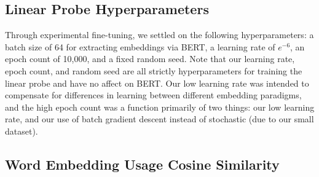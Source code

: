 \documentclass[11pt,a4paper]{article}
\begin{document}
\begin{table*}[h]
\centering
{}
\caption{Properties of the training and test datasets. Max and min freq represent the number of times the most and least common idioms occur in the data; similarly with max and min len but for sentence length. The final two columns are average lengths for the sentences with idioms and their paraphrases, respectively.}
\label{tab:DataPropertiesTable}
\end{table*}

\subsection{Linear Probe Hyperparameters}\label{section:probehyper}
Through experimental fine-tuning, we settled on the following hyperparameters: a batch size of 64 for extracting embeddings via BERT, a learning rate of \(e^{-6}\), an epoch count of 10,000, and a fixed random seed. Note that our learning rate, epoch count, and random seed are all strictly hyperparameters for training the linear probe and have no affect on BERT. Our low learning rate was intended to compensate for differences in learning between different embedding paradigms, and the high epoch count was a function primarily of two things: our low learning rate, and our use of batch gradient descent instead of stochastic (due to our small dataset).

\subsection{Word Embedding Usage Cosine Similarity}\label{section:cosinesimdiff}
\end{document}
